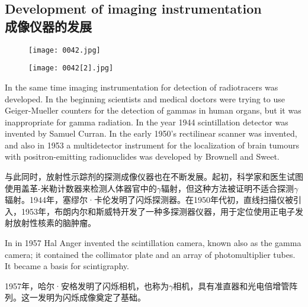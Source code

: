 \documentclass[dvipsnames, svgnames,a4paper,11pt]{article}
\begin{document}
\newpage

\subsection{Development of imaging instrumentation\\成像仪器的发展}

\begin{figure}[h]
      \centering
      \texttt{[image: 0042.jpg]}
       \label{fig33}
\end{figure}

\begin{figure}[H]
      \centering
      \texttt{[image: 0042[2].jpg]}
       \label{fig34}
\end{figure}

In the same time imaging instrumentation for detection of radiotracers was
developed. In the beginning scientists and medical doctors were trying to use Geiger-Mueller counters for the detection of gammas in human organs, but it was inappropriate for gamma radiation. In the year 1944 scintillation detector was invented by Samuel Curran. In the early 1950’s rectilinear scanner was invented, and also in 1953 a multidetector instrument for the localization of brain tumours with positron-emitting radionuclides was developed by Brownell and Sweet.

与此同时，放射性示踪剂的探测成像仪器也在不断发展。起初，科学家和医生试图使用盖革-米勒计数器来检测人体器官中的$\gamma$辐射，但这种方法被证明不适合探测$\gamma$辐射。1944年，塞缪尔·卡伦发明了闪烁探测器。在1950年代初，直线扫描仪被引入，1953年，布朗内尔和斯威特开发了一种多探测器仪器，用于定位使用正电子发射放射性核素的脑肿瘤。

In in 1957 Hal Anger invented the scintillation camera, known also as the gamma camera; it contained the collimator plate and an array of photomultiplier tubes. It became a basis for scintigraphy.


1957年，哈尔·安格发明了闪烁相机，也称为$\gamma$相机，具有准直器和光电倍增管阵列。这一发明为闪烁成像奠定了基础。
\end{document}
